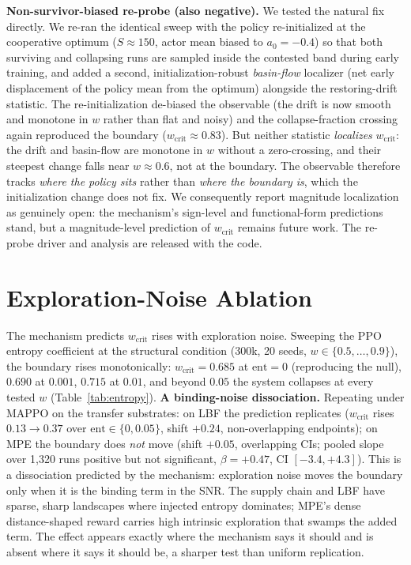 \documentclass[letterpaper]{article} %
\theoremstyle{plain}
\newcommand{\wcrit}{w_{\mathrm{crit}}}
\begin{document}
\textbf{Non-survivor-biased re-probe (also negative).} We tested the natural fix directly. We
re-ran the identical sweep with the policy re-initialized at the cooperative optimum
($S{\approx}150$, actor mean biased to $a_0{=}{-}0.4$) so that both surviving and collapsing runs
are sampled inside the contested band during early training, and added a second,
initialization-robust \emph{basin-flow} localizer (net early displacement of the policy mean from
the optimum) alongside the restoring-drift statistic. The re-initialization de-biased the
observable (the drift is now smooth and monotone in $w$ rather than flat and noisy) and the
collapse-fraction crossing again reproduced the boundary ($\wcrit\approx0.83$). But neither
statistic \emph{localizes} $\wcrit$: the drift and basin-flow are monotone in $w$ without a
zero-crossing, and their steepest change falls near $w{\approx}0.6$, not at the boundary. The
observable therefore tracks \emph{where the policy sits} rather than \emph{where the boundary is},
which the initialization change does not fix. We consequently report magnitude localization as
genuinely open: the mechanism's sign-level and functional-form predictions stand, but a
magnitude-level prediction of $\wcrit$ remains future work. The re-probe driver and analysis are
released with the code.

\section{Exploration-Noise Ablation}
\label{sec:s_entropy}

The mechanism predicts $\wcrit$ rises with exploration noise. Sweeping the PPO entropy
coefficient at the structural condition (300k, 20 seeds, $w\in\{0.5,\dots,0.9\}$), the boundary
rises monotonically: $\wcrit=0.685$ at $\text{ent}{=}0$ (reproducing the null), $0.690$ at
$0.001$, $0.715$ at $0.01$, and beyond $0.05$ the system collapses at every tested $w$
(Table~\ref{tab:entropy}). \textbf{A binding-noise dissociation.} Repeating under MAPPO on the
transfer substrates: on LBF the prediction replicates ($\wcrit$ rises $0.13\to0.37$ over
$\text{ent}\in\{0,0.05\}$, shift $+0.24$, non-overlapping endpoints); on MPE the boundary does
\emph{not} move (shift $+0.05$, overlapping CIs; pooled slope over 1{,}320 runs positive but
not significant, $\beta{=}{+}0.47$, CI $[-3.4,+4.3]$). This is a dissociation predicted by the
mechanism: exploration noise moves the boundary only when it is the binding term in the SNR.
The supply chain and LBF have sparse, sharp landscapes where injected entropy dominates; MPE's
dense distance-shaped reward carries high intrinsic exploration that swamps the added term. The
effect appears exactly where the mechanism says it should and is absent where it says it should
be, a sharper test than uniform replication.
\end{document}
